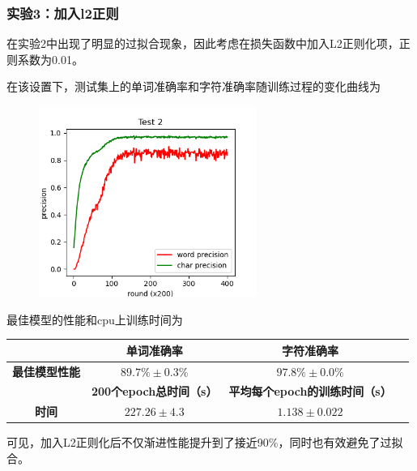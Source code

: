 \documentclass[a4paper,UTF8]{article}
\numberwithin{equation}{section}
\begin{document}
\subsubsection{实验3：加入l2正则}
\par 在实验2中出现了明显的过拟合现象，因此考虑在损失函数中加入L2正则化项，正则系数为0.01。
\par 在该设置下，测试集上的单词准确率和字符准确率随训练过程的变化曲线为
\begin{figure}[H]
    \centering
    \includegraphics[width=2.8in]{figs/fig2.png}
\end{figure}

\par 最佳模型的性能和cpu上训练时间为
\begin{table}[H]
    \centering
    \begin{tabular}{cccc}
        \hline 
         & \textbf{单词准确率} & \textbf{字符准确率} \\ 
        \hline 
        \textbf{最佳模型性能} & $89.7\% \pm 0.3\%$ & $97.8\%\pm 0.0\%$ \\ 
        \hline
        \hline
        &\textbf{200个epoch总时间（s）}&\textbf{平均每个epoch的训练时间（s）}\\
        \hline
        \textbf{时间} &$227.26\pm 4.3$ & $1.138\pm0.022$\\
        \hline
    \end{tabular}
\end{table}
\par 可见，加入L2正则化后不仅渐进性能提升到了接近90\%，同时也有效避免了过拟合。
\end{document}
